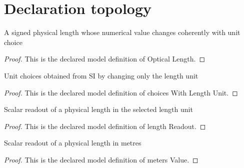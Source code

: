 \section{Declaration topology}
\begin{definition}
  \label{def:physics:phyx-mini-0136:phyxminiproblems-problemphyxmini0136-opticallength}
  A signed physical length whose numerical value changes coherently with unit choice
\end{definition}
\begin{proof}
  This is the declared model definition of Optical Length.
\end{proof}
\begin{definition}
  \label{def:physics:phyx-mini-0136:phyxminiproblems-problemphyxmini0136-choiceswithlengthunit}
  Unit choices obtained from SI by changing only the length unit
\end{definition}
\begin{proof}
  This is the declared model definition of choices With Length Unit.
\end{proof}
\begin{definition}
  \label{def:physics:phyx-mini-0136:phyxminiproblems-problemphyxmini0136-lengthreadout}
  Scalar readout of a physical length in the selected length unit
\end{definition}
\begin{proof}
  This is the declared model definition of length Readout.
\end{proof}
\begin{definition}
  \label{def:physics:phyx-mini-0136:phyxminiproblems-problemphyxmini0136-metersvalue}
  Scalar readout of a physical length in metres
\end{definition}
\begin{proof}
  This is the declared model definition of meters Value.
\end{proof}
